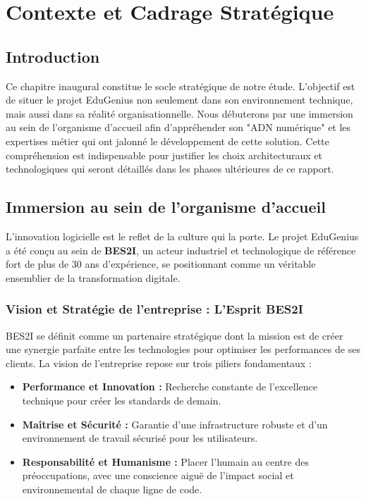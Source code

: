 \chapter{Contexte et Cadrage Stratégique}

\section*{Introduction}
Ce chapitre inaugural constitue le socle stratégique de notre étude. L'objectif est de situer le projet EduGenius non seulement dans son environnement technique, mais aussi dans sa réalité organisationnelle. Nous débuterons par une immersion au sein de l'organisme d'accueil afin d'appréhender son "ADN numérique" et les expertises métier qui ont jalonné le développement de cette solution. Cette compréhension est indispensable pour justifier les choix architecturaux et technologiques qui seront détaillés dans les phases ultérieures de ce rapport.

\section{Immersion au sein de l’organisme d’accueil}
L'innovation logicielle est le reflet de la culture qui la porte. Le projet EduGenius a été conçu au sein de \textbf{BES2I}, un acteur industriel et technologique de référence fort de plus de 30 ans d'expérience, se positionnant comme un véritable ensemblier de la transformation digitale.

\subsection{Vision et Stratégie de l'entreprise : L'Esprit BES2I}
BES2I se définit comme un partenaire stratégique dont la mission est de créer une synergie parfaite entre les technologies pour optimiser les performances de ses clients. La vision de l'entreprise repose sur trois piliers fondamentaux :
\begin{itemize}
    \item \textbf{Performance et Innovation :} Recherche constante de l'excellence technique pour créer les standards de demain.
    \item \textbf{Maîtrise et Sécurité :} Garantie d'une infrastructure robuste et d'un environnement de travail sécurisé pour les utilisateurs.
    \item \textbf{Responsabilité et Humanisme :} Placer l'humain au centre des préoccupations, avec une conscience aiguë de l'impact social et environnemental de chaque ligne de code.
\end{itemize}

